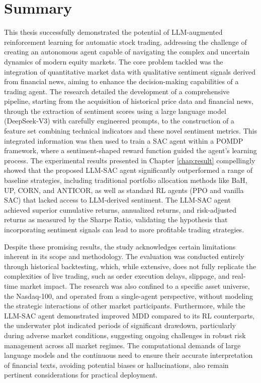 \section{Summary}
This thesis successfully demonstrated the potential of LLM-augmented reinforcement learning for automatic stock trading, addressing the challenge of creating an autonomous agent capable of navigating the complex and uncertain dynamics of modern equity markets. The core problem tackled was the integration of quantitative market data with qualitative sentiment signals derived from financial news, aiming to enhance the decision-making capabilities of a trading agent. The research detailed the development of a comprehensive pipeline, starting from the acquisition of historical price data and financial news, through the extraction of sentiment scores using a large language model (DeepSeek-V3) with carefully engineered prompts, to the construction of a feature set combining technical indicators and these novel sentiment metrics. This integrated information was then used to train a \gls{SAC} agent within a \gls{POMDP} framework, where a sentiment-shaped reward function guided the agent's learning process. The experimental results presented in Chapter \ref{chap:result} compellingly showed that the proposed \gls{LLM}-\gls{SAC} agent significantly outperformed a range of baseline strategies, including traditional portfolio allocation methods like \gls{BaH}, \gls{UP}, \gls{CORN}, and \gls{ANTICOR}, as well as standard \gls{RL} agents (PPO and vanilla SAC) that lacked access to \gls{LLM}-derived sentiment. The \gls{LLM}-\gls{SAC} agent achieved superior cumulative returns, annualized returns, and risk-adjusted returns as measured by the Sharpe Ratio, validating the hypothesis that incorporating sentiment signals can lead to more profitable trading strategies.

Despite these promising results, the study acknowledges certain limitations inherent in its scope and methodology. The evaluation was conducted entirely through historical backtesting, which, while extensive, does not fully replicate the complexities of live trading, such as order execution delays, slippage, and real-time market impact. The research was also confined to a specific asset universe, the Nasdaq-100, and operated from a single-agent perspective, without modeling the strategic interactions of other market participants. Furthermore, while the \gls{LLM}-\gls{SAC} agent demonstrated improved \gls{MDD} compared to its \gls{RL} counterparts, the underwater plot indicated periods of significant drawdown, particularly during adverse market conditions, suggesting ongoing challenges in robust risk management across all market regimes. The computational demands of large language models and the continuous need to ensure their accurate interpretation of financial texts, avoiding potential biases or hallucinations, also remain pertinent considerations for practical deployment.

